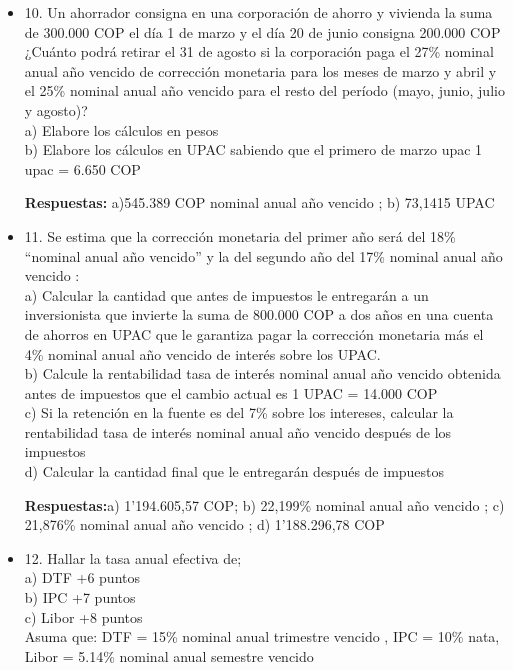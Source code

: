 \begin{itemize}
       \textbf{Respuesta:} 26,36\% nominal anual año vencido \\
       \medskip

 \item 10. Un ahorrador consigna en una corporación de ahorro y vivienda la suma de 300.000 COP el día 1 de  marzo y el día 20 de junio consigna  200.000  COP ¿Cuánto  podrá  retirar  el  31  de  agosto  si la corporación  paga el  27\% nominal anual año vencido de corrección monetaria para los meses de marzo y abril y el 25\% nominal anual año vencido para el resto del período (mayo, junio, julio y agosto)?\\
       a) Elabore los cálculos en pesos\\
       b) Elabore los cálculos en UPAC sabiendo que el primero de marzo upac 1 upac = 6.650 COP
       
       \textbf{Respuestas:} a)545.389 COP nominal anual año vencido ; b) 73,1415 UPAC\\
       \medskip

 \item 11. Se estima que la corrección monetaria del primer año será del 18\% “nominal anual año vencido” y la del segundo año del 17\% nominal anual año vencido :\\
       a) Calcular la cantidad que antes de impuestos le entregarán a un inversionista que invierte la suma de 800.000 COP  a dos años en una cuenta de ahorros en UPAC que le garantiza pagar la corrección monetaria más el 4\% nominal anual año vencido de interés sobre los UPAC.\\
       b) Calcule la rentabilidad tasa de interés nominal anual año vencido obtenida antes de impuestos que el cambio actual es 1 UPAC = 14.000 COP\\
       c) Si la retención en la fuente es del 7\% sobre los intereses, calcular la rentabilidad tasa de interés nominal anual año vencido después de los impuestos\\
       d) Calcular la cantidad final que le entregarán después de impuestos
       
       \textbf{Respuestas:}a) 1'194.605,57 COP;  b) 22,199\% nominal anual año vencido ; c) 21,876\% nominal anual año vencido ; d) 1'188.296,78 COP\\
       \medskip

 \item 12. Hallar la tasa anual efectiva de;\\
       a) DTF +6 puntos\\
       b) IPC +7 puntos\\
       c) Libor +8 puntos\\
       Asuma que: DTF = 15\% nominal anual trimestre vencido , IPC = 10\% nata, Libor = 5.14\% nominal anual semestre vencido 
       

\end{itemize}
